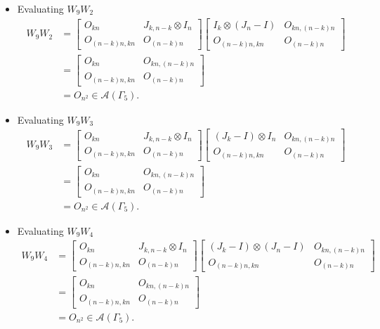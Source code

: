 \begin{itemize}
\item Evaluating $W_{9}W_{2}$
\begin{align*}
    W_9W_2
    &= \begin{bmatrix}
        O_{kn} & J_{k,n-k} \otimes I_n \\
        O_{(n-k)n,kn} & O_{(n-k)n}
    \end{bmatrix}\begin{bmatrix}
        I_{k}\otimes (J_n-I) & O_{kn, (n-k)n} \\
        O_{(n-k)n,kn} & O_{(n-k)n}
    \end{bmatrix}\\
    &= \begin{bmatrix}
        O_{kn} & O_{kn, (n-k)n} \\
        O_{(n-k)n,kn} & O_{(n - k)n}
    \end{bmatrix}\\
    &= O_{n^2} \in\mathcal{A}(\Gamma_5).
\end{align*}

\item Evaluating $W_{9}W_{3}$
\begin{align*}
    W_9W_3
    &= \begin{bmatrix}
        O_{kn} & J_{k,n-k} \otimes I_n \\
        O_{(n-k)n,kn} & O_{(n-k)n}
    \end{bmatrix}\begin{bmatrix}
        (J_k-I)\otimes I_n & O_{kn, (n-k)n} \\
        O_{(n-k)n,kn} & O_{(n-k)n}
    \end{bmatrix}\\
    &= \begin{bmatrix}
        O_{kn} & O_{kn, (n-k)n} \\
        O_{(n-k)n,kn} & O_{(n - k)n}
    \end{bmatrix}\\
    &= O_{n^2} \in\mathcal{A}(\Gamma_5).
\end{align*}

\item Evaluating $W_{9}W_{4}$
\begin{align*}
    W_9W_4
    &= \begin{bmatrix}
        O_{kn} & J_{k,n-k} \otimes I_n \\
        O_{(n-k)n,kn} & O_{(n-k)n}
    \end{bmatrix}\begin{bmatrix}
        (J_k-I)\otimes (J_n-I) & O_{kn, (n-k)n} \\
        O_{(n-k)n,kn} & O_{(n-k)n}
    \end{bmatrix}\\
    &= \begin{bmatrix}
        O_{kn} & O_{kn, (n-k)n} \\
        O_{(n-k)n,kn} & O_{(n - k)n}
    \end{bmatrix}\\
    &= O_{n^2} \in\mathcal{A}(\Gamma_5).
\end{align*}


\end{itemize}
